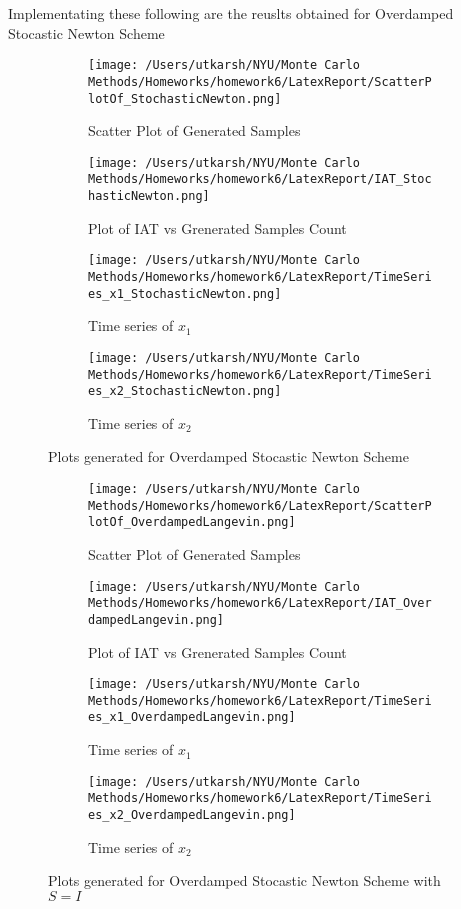 \documentclass[11pt]{article}
\begin{document}
Implementating these following are the reuslts obtained for Overdamped Stocastic Newton Scheme
\begin{figure}[H]
	\centering
	\begin{subfigure}{.22\textwidth}
		\texttt{[image: /Users/utkarsh/NYU/Monte Carlo Methods/Homeworks/homework6/LatexReport/ScatterPlotOf\_StochasticNewton.png]}
		\caption{Scatter Plot of Generated Samples}
		\label{fig:ovsns_scatter}
	\end{subfigure}
	\begin{subfigure}{.22\textwidth}
		\texttt{[image: /Users/utkarsh/NYU/Monte Carlo Methods/Homeworks/homework6/LatexReport/IAT\_StochasticNewton.png]}
		\caption{Plot of IAT vs Grenerated Samples Count}
		\label{fig:ovsns_iat}
	\end{subfigure}
	\begin{subfigure}{.22\textwidth}
		\texttt{[image: /Users/utkarsh/NYU/Monte Carlo Methods/Homeworks/homework6/LatexReport/TimeSeries\_x1\_StochasticNewton.png]}
		\caption{Time series of $x_1$}
		\label{fig:ovsns_time_x1}
	\end{subfigure}
	\begin{subfigure}{.22\textwidth}
		\texttt{[image: /Users/utkarsh/NYU/Monte Carlo Methods/Homeworks/homework6/LatexReport/TimeSeries\_x2\_StochasticNewton.png]}
		\caption{Time series of $x_2$}
		\label{fig:ovsns_time_x2}
	\end{subfigure}
	\caption{Plots generated for Overdamped Stocastic Newton Scheme}
	\label{fig:ovsns_plots}
\end{figure}

\begin{figure}[H]
	\centering
	\begin{subfigure}{.22\textwidth}
		\texttt{[image: /Users/utkarsh/NYU/Monte Carlo Methods/Homeworks/homework6/LatexReport/ScatterPlotOf\_OverdampedLangevin.png]}
		\caption{Scatter Plot of Generated Samples}
		\label{fig:ols_scatter}
	\end{subfigure}
	\begin{subfigure}{.22\textwidth}
		\texttt{[image: /Users/utkarsh/NYU/Monte Carlo Methods/Homeworks/homework6/LatexReport/IAT\_OverdampedLangevin.png]}
		\caption{Plot of IAT vs Grenerated Samples Count}
		\label{fig:ols_iat}
	\end{subfigure}
	\begin{subfigure}{.22\textwidth}
		\texttt{[image: /Users/utkarsh/NYU/Monte Carlo Methods/Homeworks/homework6/LatexReport/TimeSeries\_x1\_OverdampedLangevin.png]}
		\caption{Time series of $x_1$}
		\label{fig:ols_time_x1}
	\end{subfigure}
	\begin{subfigure}{.22\textwidth}
		\texttt{[image: /Users/utkarsh/NYU/Monte Carlo Methods/Homeworks/homework6/LatexReport/TimeSeries\_x2\_OverdampedLangevin.png]}
		\caption{Time series of $x_2$}
		\label{fig:ols_time_x2}
	\end{subfigure}
	\caption{Plots generated for Overdamped Stocastic Newton Scheme with $S = I$}
	\label{fig:ols_plots}
\end{figure}
\end{document}
